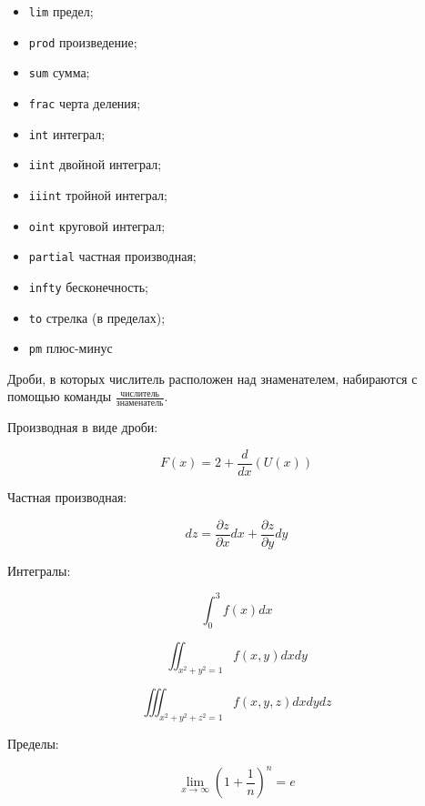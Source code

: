 \documentclass[
  a4paper,
]{book}
\providecommand{\tightlist}{%
  \setlength{\itemsep}{0pt}\setlength{\parskip}{0pt}}
\theoremstyle{definition}
\theoremstyle{definition}
\theoremstyle{definition}
\theoremstyle{definition}
\theoremstyle{remark}
\begin{document}
\begin{itemize}
\tightlist
\item
  \texttt{lim} предел;
\item
  \texttt{prod} произведение;
\item
  \texttt{sum} сумма;
\item
  \texttt{frac} черта деления;
\item
  \texttt{int} интеграл;
\item
  \texttt{iint} двойной интеграл;
\item
  \texttt{iiint} тройной интеграл;
\item
  \texttt{oint} круговой интеграл;
\item
  \texttt{partial} частная производная;
\item
  \texttt{infty} бесконечность;
\item
  \texttt{to} стрелка (в пределах);
\item
  \texttt{pm} плюс-минус
\end{itemize}

Дроби, в которых числитель расположен над знаменателем, набираются с помощью команды \(\frac{числитель}{знаменатель}\).

Производная в виде дроби:

\begin{equation}
F(x) = 2+\frac{d}{dx}(U(x))
\end{equation}

Частная производная:

\begin{equation}
dz = \frac{\partial z}{\partial x} dx + \frac{\partial z}{\partial y} dy
\end{equation}

Интегралы:

\begin{equation}
\int_{0}^{3} f(x) dx
\end{equation}

\begin{equation}
\iint_{x^2 + y^2 = 1} f(x, y) dx dy
\end{equation}

\begin{equation}
\iiint_{x^2 + y^2 + z^2 = 1} f(x, y, z) dx dy dz
\end{equation}

Пределы:

\begin{equation}
\lim\limits_{x \to \infty} \left(1 + \frac{1}{n} \right)^n = e
\end{equation}
\end{document}

